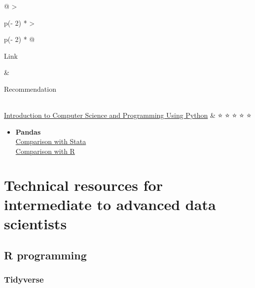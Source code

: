 \documentclass[
  letterpaper,
  DIV=11,
  numbers=noendperiod,
  oneside]{scrreprt}
\providecommand{\tightlist}{%
  \setlength{\itemsep}{0pt}\setlength{\parskip}{0pt}}\usepackage{longtable,booktabs,array}
\begin{document}
\begin{longtable}[]{@{}
  >{\raggedright\arraybackslash}p{(\columnwidth - 2\tabcolsep) * }
  >{\raggedright\arraybackslash}p{(\columnwidth - 2\tabcolsep) * }@{}}
\toprule\noalign{}
\begin{minipage}[b]{\linewidth}\raggedright
Link
\end{minipage} & \begin{minipage}[b]{\linewidth}\raggedright
Recommendation
\end{minipage} \\
\midrule\noalign{}
\endhead
\bottomrule\noalign{}
\endlastfoot
\href{https://www.edx.org/course/introduction-to-computer-science-and-programming-7}{Introduction
to Computer Science and Programming Using Python} & {⭐} {⭐} {⭐} {⭐}
{⭐} \\
\end{longtable}

\begin{itemize}
\tightlist
\item
  \textbf{Pandas}\\
  \href{https://pandas.pydata.org/docs/getting_started/comparison/comparison_with_stata.html}{Comparison
  with Stata}\\
  \href{https://pandas.pydata.org/docs/getting_started/comparison/comparison_with_r.html}{Comparison
  with R}
\end{itemize}

\hypertarget{sec-advanced-resources}{%
\chapter{Technical resources for intermediate to advanced data
scientists}\label{sec-advanced-resources}}

\hypertarget{r-programming}{%
\section{R programming}\label{r-programming}}

\hypertarget{tidyverse}{%
\subsection{Tidyverse}\label{tidyverse}}
\end{document}

